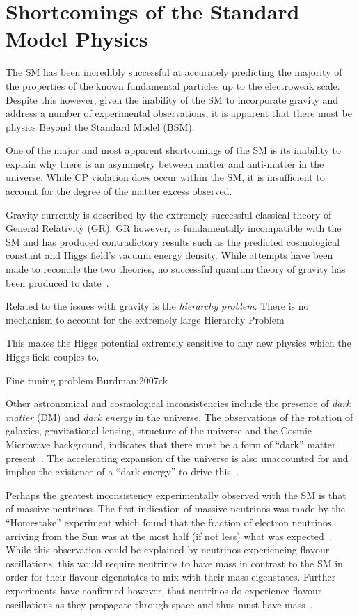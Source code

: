 \section{Shortcomings of the Standard Model Physics}\label{sec:bsm}
The SM has been incredibly successful at accurately predicting the majority of the properties of the known fundamental particles up to the electroweak scale.
Despite this however, given the inability of the SM to incorporate gravity and address a number of experimental observations, it is apparent that there must be physics Beyond the Standard Model (BSM).

One of the major and most apparent shortcomings of the SM is its inability to explain why there is an asymmetry between matter and anti-matter in the universe.
While CP violation does occur within the SM, it is insufficient to account for the degree of the matter excess observed.

Gravity currently is described by the extremely successful classical theory of General Relativity (GR).
GR however, is fundamentally incompatible with the SM and  has produced contradictory results such as the predicted cosmological constant and Higgs field's vacuum energy density.
While attempts have been made to reconcile the two theories, no successful quantum theory of gravity has been produced to date~\cite{Sola:2013gha}.	

Related to the issues with gravity is the \emph{hierarchy problem}.
There is no mechanism to account for the extremely large 
Hierarchy Problem

This makes the Higgs potential extremely sensitive to any new physics which the Higgs field couples to.

Fine tuning problem
Burdman:2007ck

Other astronomical and cosmological inconsistencies include the presence of \emph{dark matter} (DM) and \emph{dark energy} in the universe.
The observations of the rotation of galaxies, gravitational lensing, structure of the universe and the Cosmic Microwave background, indicates that there must be a form of ``dark'' matter present~\cite{Aghanim:2018eyx}.
The accelerating expansion of the universe is also unaccounted for and implies the existence of a ``dark energy'' to drive this~\cite{Peebles:2002gy,Aghanim:2018eyx}.

Perhaps the greatest inconsistency experimentally observed with the SM is that of massive neutrinos.
The first indication of massive neutrinos was made by the ``Homestake'' experiment which found that the fraction of electron neutrinos arriving from the Sun was at the most half (if not less) what was expected~\cite{PhysRevLett.20.1205}.
While this observation could be explained by neutrinos experiencing flavour oscillations, this would require neutrinos to have mass in contrast to the SM in order for their flavour eigenstates to mix with their mass eigenstates.
Further experiments have confirmed however, that neutrinos do experience flavour oscillations as they propagate through space and thus must have mass~\cite{Fukuda:1998mi,Ahmad:2001an,PhysRevD.88.032002}.
